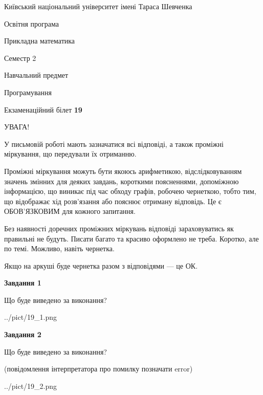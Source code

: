 \documentclass[12pt, ukrainian]{article}
\begin{document}
{{\begin {small}\par
{ \center  Київський національний університет імені Тараса Шевченка \par}
{\parbox {5 cm}{Освітня програма \hfill}{\parbox {7 cm}{Прикладна математика\hfill}}\parbox {6 cm}{\hfill Семестр 2}}\par
{\parbox {5 cm} {Навчальний предмет \hfill}\parbox {7 cm}{Програмування \hfill}\parbox {6cm}{\hfill}\par}\vspace{-7pt} \end{small}}{\center Екзаменаційний білет \No \textbf
{ 19 }\par}}
{
\begin {large}
УВАГА!

У письмовій роботі мають зазначатися всі відповіді, а також проміжні міркування, що передували їх отриманню.

Проміжні міркування можуть бути якоюсь арифметикою, відслідковуванням зна\-чень змінних для деяких завдань,
короткими поясненнями, допоміжною інформацією, що виникає під час обходу графів, робочею чернеткою,
тобто тим, що відображає хід розв’язання або пояснює отриману відповідь.
Це є ОБОВ’ЯЗКОВИМ для кожного запитання.

Без наявності доречних проміжних міркувань відповіді зараховуватись як правиль\-ні не будуть.
Писати багато та красиво оформлено не треба. Коротко, але по темі. Можли\-во, навіть чернетка.

Якщо на аркуші буде чернетка разом з відповідями --- це ОК.

\newpage

{\begin {center}\textbf{Завдання 1}\end {center}}\par
Що буде виведено за виконання?\par
\begin{center}
	{../pict/19_1.png}
\end{center}
\newpage

{\begin {center}\textbf{Завдання 2}\end {center}}\par
Що буде виведено за виконання?\par
 (повідомлення інтерпретатора про помилку позначати error)\par
\begin{center}
	{../pict/19_2.png}
\end{center}
\newpage


\end{large}}
\end{document}
